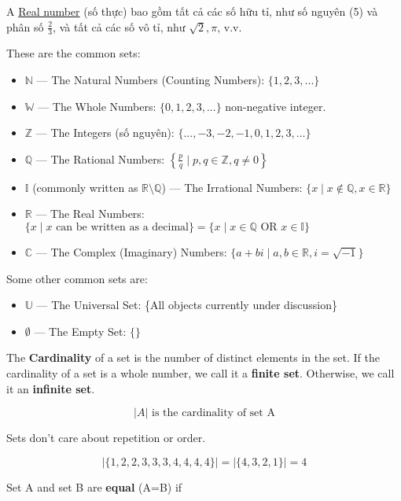 A \href{https://en.wikipedia.org/wiki/Real_number}{Real number} (số thực) bao gồm tất cả các số hữu tỉ, như số nguyên (5) và phân số \(\frac{2}{3}\), và tất cả các số vô tỉ, như \(\sqrt{2}, \pi\), v.v.

These are the common sets:

\begin{itemize}
  \item $\mathbb{N}$ --- The Natural Numbers (Counting Numbers): $\{1,2,3,...\}$
  \item $\mathbb{W}$ --- The Whole Numbers: $\{0,1,2,3,...\}$ non-negative integer.
  \item $\mathbb{Z}$ --- The Integers (số nguyên): $\{...,-3,-2,-1,0,1,2,3,...\}$
  \item $\mathbb{Q}$ --- The Rational Numbers: $\left\{ \frac{p}{q} \mid p,q \in \mathbb{Z}, q \neq 0 \right\}$
  \item $\mathbb{I}$ (commonly written as $\mathbb{R} \setminus \mathbb{Q}$) --- The Irrational Numbers: $\{x \mid x \not\in \mathbb{Q}, x \in \mathbb{R}\}$
  \item $\mathbb{R}$ --- The Real Numbers: $\{x \mid x \text{ can be written as a decimal}\} = \{x \mid x \in \mathbb{Q} \text{ OR } x \in \mathbb{I}\}$
  \item $\mathbb{C}$ --- The Complex (Imaginary) Numbers: $\{a+bi \mid a,b \in \mathbb{R} , i=\sqrt{-1}\}$
\end{itemize}

Some other common sets are:

\begin{itemize}
  \item $\mathbb{U}$ --- The Universal Set: \{All objects currently under discussion\}
  \item $\emptyset$ --- The Empty Set: \(\{\}\)
\end{itemize}

The \textbf{Cardinality} of a set is the number of distinct elements in the set. If the cardinality of a set is a whole number, we call it a \textbf{finite set}. Otherwise, we call it an \textbf{infinite set}.

\[|A| \text{ is the cardinality of set A}\]

Sets don't care about repetition or order.

\[ |\{1,2,2,3,3,3,4,4,4,4\}|=|\{4,3,2,1\}|=4 \]

\vspace{5 mm}

Set A and set B are \textbf{equal} (A=B) if


